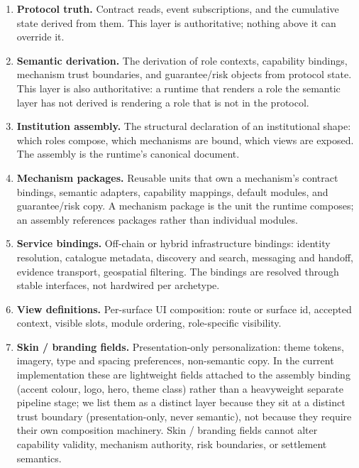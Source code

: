 \documentclass[11pt,a4paper]{article}
\theoremstyle{definition}
\theoremstyle{remark}
\begin{document}
\begin{enumerate}
  \item \textbf{Protocol truth.} Contract reads, event subscriptions,
    and the cumulative state derived from them. This layer is
    authoritative; nothing above it can override it.
  \item \textbf{Semantic derivation.} The derivation of role
    contexts, capability bindings, mechanism trust boundaries, and
    guarantee/risk objects from protocol state. This layer is also
    authoritative: a runtime that renders a role the semantic layer
    has not derived is rendering a role that is not in the protocol.
  \item \textbf{Institution assembly.} The structural declaration
    of an institutional shape: which roles compose, which mechanisms
    are bound, which views are exposed. The assembly is the runtime's
    canonical document.
  \item \textbf{Mechanism packages.} Reusable units that own a
    mechanism's contract bindings, semantic adapters, capability
    mappings, default modules, and guarantee/risk copy. A mechanism
    package is the unit the runtime composes; an assembly references
    packages rather than individual modules.
  \item \textbf{Service bindings.} Off-chain or hybrid infrastructure
    bindings: identity resolution, catalogue metadata, discovery and
    search, messaging and handoff, evidence transport, geospatial
    filtering. The bindings are resolved through stable interfaces,
    not hardwired per archetype.
  \item \textbf{View definitions.} Per-surface UI composition: route
    or surface id, accepted context, visible slots, module ordering,
    role-specific visibility.
  \item \textbf{Skin / branding fields.} Presentation-only
    personalization: theme tokens, imagery, type and spacing
    preferences, non-semantic copy. In the current implementation
    these are lightweight fields attached to the assembly
    binding (accent colour, logo, hero, theme class) rather than
    a heavyweight separate pipeline stage; we list them as a
    distinct layer because they sit at a distinct trust boundary
    (presentation-only, never semantic), not because they
    require their own composition machinery. Skin / branding
    fields cannot alter capability validity, mechanism
    authority, risk boundaries, or settlement semantics.
\end{enumerate}
\end{document}

